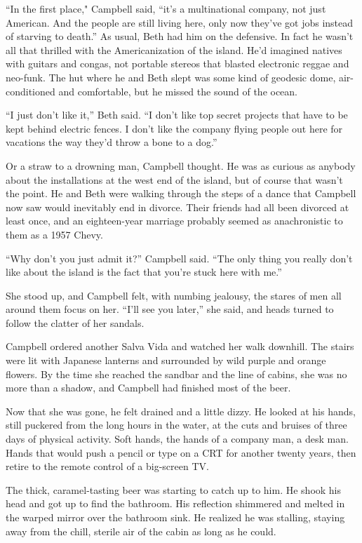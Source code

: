 ``In the first place," Campbell said, ``it's a multinational company, not just American. And the people are still living here, only now they've got jobs instead of starving to death.'' As usual, Beth had him on the defensive. In fact he wasn't all that thrilled with the Americanization of the island. He'd imagined natives with guitars and congas, not portable stereos that blasted electronic reggae and neo-funk. The hut where he and Beth slept was some kind of geodesic dome, air-conditioned and comfortable, but he missed the sound of the ocean.

``I just don't like it,'' Beth said. ``I don't like top secret projects that have to be kept behind electric fences. I don't like the company flying people out here for vacations the way they'd throw a bone to a dog.''

Or a straw to a drowning man, Campbell thought. He was as curious as anybody about the installations at the west end of the island, but of course that wasn't the point. He and Beth were walking through the steps of a dance that Campbell now saw would inevitably end in divorce. Their friends had all been divorced at least once, and an eighteen-year marriage probably seemed as anachronistic to them as a 1957 Chevy.

``Why don't you just admit it?'' Campbell said. ``The only thing you really don't like about the island is the fact that you're stuck here with me.''

She stood up, and Campbell felt, with numbing jealousy, the stares of men all around them focus on her. ``I'll see you later,'' she said, and heads turned to follow the clatter of her sandals.

Campbell ordered another Salva Vida and watched her walk downhill. The stairs were lit with Japanese lanterns and surrounded by wild purple and orange flowers. By the time she reached the sandbar and the line of cabins, she was no more than a shadow, and Campbell had finished most of the beer.

Now that she was gone, he felt drained and a little dizzy. He looked at his hands, still puckered from the long hours in the water, at the cuts and bruises of three days of physical activity. Soft hands, the hands of a company man, a desk man. Hands that would push a pencil or type on a CRT for another twenty years, then retire to the remote control of a big-screen TV.

The thick, caramel-tasting beer was starting to catch up to him. He shook his head and got up to find the bathroom. His reflection shimmered and melted in the warped mirror over the bathroom sink. He realized he was stalling, staying away from the chill, sterile air of the cabin as long as he could.

